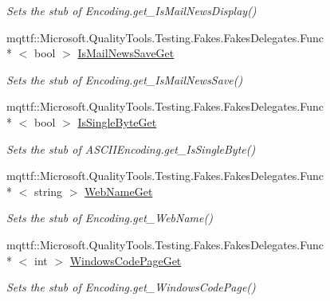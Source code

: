 \begin{DoxyCompactItemize}
\begin{DoxyCompactList}\small\item\em Sets the stub of Encoding.\-get\-\_\-\-Is\-Mail\-News\-Display()\end{DoxyCompactList}\item 
mqttf\-::\-Microsoft.\-Quality\-Tools.\-Testing.\-Fakes.\-Fakes\-Delegates.\-Func\\*
$<$ bool $>$ \hyperlink{class_system_1_1_text_1_1_fakes_1_1_stub_a_s_c_i_i_encoding_a514a9955a907d658ec49dd2ff5c19d1d}{Is\-Mail\-News\-Save\-Get}
\begin{DoxyCompactList}\small\item\em Sets the stub of Encoding.\-get\-\_\-\-Is\-Mail\-News\-Save()\end{DoxyCompactList}\item 
mqttf\-::\-Microsoft.\-Quality\-Tools.\-Testing.\-Fakes.\-Fakes\-Delegates.\-Func\\*
$<$ bool $>$ \hyperlink{class_system_1_1_text_1_1_fakes_1_1_stub_a_s_c_i_i_encoding_ac0a70203ba492530499a6c735e57f43e}{Is\-Single\-Byte\-Get}
\begin{DoxyCompactList}\small\item\em Sets the stub of A\-S\-C\-I\-I\-Encoding.\-get\-\_\-\-Is\-Single\-Byte()\end{DoxyCompactList}\item 
mqttf\-::\-Microsoft.\-Quality\-Tools.\-Testing.\-Fakes.\-Fakes\-Delegates.\-Func\\*
$<$ string $>$ \hyperlink{class_system_1_1_text_1_1_fakes_1_1_stub_a_s_c_i_i_encoding_a4b50e5df574e8565c08a0626e6c9ddd9}{Web\-Name\-Get}
\begin{DoxyCompactList}\small\item\em Sets the stub of Encoding.\-get\-\_\-\-Web\-Name()\end{DoxyCompactList}\item 
mqttf\-::\-Microsoft.\-Quality\-Tools.\-Testing.\-Fakes.\-Fakes\-Delegates.\-Func\\*
$<$ int $>$ \hyperlink{class_system_1_1_text_1_1_fakes_1_1_stub_a_s_c_i_i_encoding_a0a3ca0c97703dfb4527f88d6cd12c9e7}{Windows\-Code\-Page\-Get}
\begin{DoxyCompactList}\small\item\em Sets the stub of Encoding.\-get\-\_\-\-Windows\-Code\-Page()\end{DoxyCompactList}\end{DoxyCompactItemize}
